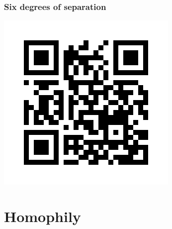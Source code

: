 \documentclass{beamer}
\begin{document}
\begin{frame}
   \frametitle{Six degrees of separation}
   \centering
   \includegraphics[width = .7\textwidth]{png/bacon.png}
\end{frame}

\section[Homophily]{Homophily}
\end{document}
